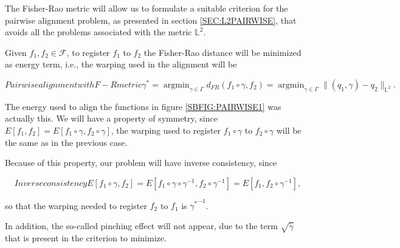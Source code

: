 
The Fisher-Rao metric will allow us to formulate a suitable criterion for the
pairwise alignment problem, as presented in section \ref{SEC:L2PAIRWISE},
 that avoids all the problems associated with the metric $\mathbb{L}^2$.

Given $f_1, f_2 \in \mathscr{F}$, to register $f_1$ to $f_2$ the Fisher-Rao distance
will be minimized as energy term, i.e.,
the warping used in the alignment will be

\begin{equation}[]{Pairwise alignment with F-R metric}
\gamma^{*}= \operatorname{argmin}_{\gamma \in \Gamma} d_{FR}(f_1 \circ \gamma,
f_2) = \operatorname{argmin}_{\gamma \in \Gamma} \|
(q_1, \gamma) - q_2 \|_{\mathbb{L}^2}.
\end{equation}

The energy used to align the functions in figure \ref{SBFIG:PAIRWISE1} was
actually this.
We will have a property of symmetry, since
$E[f_1, f_2] = E[f_1 \circ \gamma, f_2 \circ \gamma]$, the warping used to
register $f_1 \circ \gamma$ to $f_2 \circ \gamma$ will be the same as in the
previous case.

Because of this property, our problem will have inverse consistency, since

\begin{equation}[]{Inverse consistency}
E[f_1 \circ \gamma, f_2] = E[f_1 \circ \gamma \circ \gamma^{-1}, f_2
\circ \gamma^{-1}] = E[f_1, f_2 \circ \gamma^{-1}],
\end{equation}

so that the warping needed to register $f_2$ to $f_1$  is ${\gamma^*}^{-1}$.


In addition, the so-called pinching effect will not appear, due to the term
$\sqrt{\dot \gamma}$ that is present in the criterion to minimize.
